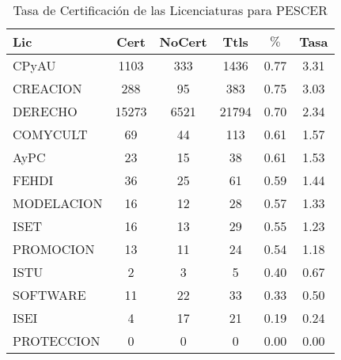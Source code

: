 \documentclass{article}
\begin{document}
\begin{table}[h]
\centering
\begin{tabular}{|l|cc|c|cc|}\hline
Lic & Cert & NoCert & Ttls & $\%$ & Tasa \\\hline
CPyAU & 1103 & 333 & 1436 & 0.77 & 3.31 \\
CREACION & 288 & 95 & 383 & 0.75 & 3.03 \\\hline\hline
DERECHO & 15273 & 6521 & 21794 & 0.70 & 2.34 \\\hline\hline
COMYCULT & 69 & 44 & 113 & 0.61 & 1.57 \\
AyPC & 23 & 15 & 38 & 0.61 & 1.53 \\\hline\hline
FEHDI & 36 & 25 & 61 & 0.59 & 1.44 \\
MODELACION & 16 & 12 & 28 & 0.57 & 1.33 \\
ISET & 16 & 13 & 29 & 0.55 & 1.23 \\
PROMOCION & 13 & 11 & 24 & 0.54 & 1.18 \\\hline\hline
ISTU & 2 & 3 & 5 & 0.40 & 0.67 \\
SOFTWARE & 11 & 22 & 33 & 0.33 & 0.50 \\\hline\hline
ISEI & 4 & 17 & 21 & 0.19 & 0.24 \\
PROTECCION & 0 & 0 & 0 & 0.00 & 0.00 \\\hline\hline

\end{tabular}
\caption{Tasa de Certificación de las Licenciaturas para PESCER}
\end{table}
\end{document}
